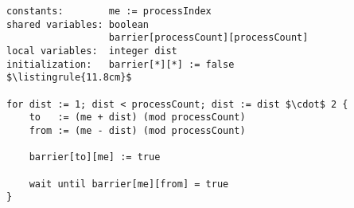 \begin{center}
\begin{minipage}{\textwidth}
\begin{lstlisting}[mathescape, linewidth=11.8cm]
constants:        me := processIndex
shared variables: boolean
                  barrier[processCount][processCount]
local variables:  integer dist
initialization:   barrier[*][*] := false
$\listingrule{11.8cm}$

for dist := 1; dist < processCount; dist := dist $\cdot$ 2 {
	to   := (me + dist) (mod processCount)
	from := (me - dist) (mod processCount)
	
	barrier[to][me] := true
	
	wait until barrier[me][from] = true
}
\end{lstlisting}
\end{minipage}
\end{center}
